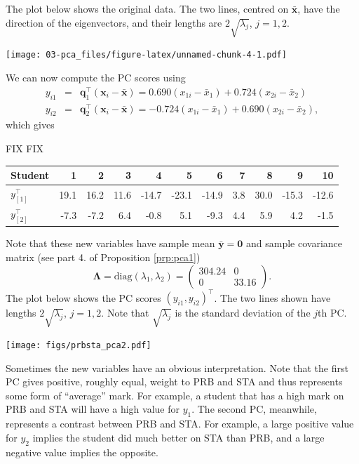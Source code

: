\documentclass[]{book}
\theoremstyle{definition}
\theoremstyle{definition}
\theoremstyle{definition}
\theoremstyle{remark}
\begin{document}
The plot below shows the original data. The two lines, centred on \(\bar{\boldsymbol x}\), have the direction of the eigenvectors, and their lengths are \(2 \sqrt{\lambda_j}\), \(j=1,2\).

\texttt{[image: 03-pca\_files/figure-latex/unnamed-chunk-4-1.pdf]}

We can now compute the PC scores using
\begin{eqnarray*}
y_{i1} &=& \boldsymbol q_1^\top (\boldsymbol x_i - \bar{\boldsymbol x}) = 0.690 (x_{1i} - \bar{x}_1) + 0.724 (x_{2i} - \bar{x}_2) \\
y_{i2} &=& \boldsymbol q_2^\top (\boldsymbol x_i - \bar{\boldsymbol x}) = -0.724 (x_{1i} - \bar{x}_1) + 0.690 (x_{2i} - \bar{x}_2),
\end{eqnarray*}
which gives

FIX FIX

\begin{tabular}{l|rrrrrrrrrr}
Student & 1 & 2 & 3 & 4 & 5 & 6 & 7 & 8 & 9 & 10 \\ \hline
$y_{[1]}^\top$ & 19.1 & 16.2 & 11.6 & -14.7 & -23.1 & -14.9 & 3.8 & 30.0 & -15.3 & -12.6 \\
$y_{[2]}^\top$ & -7.3 & -7.2 & 6.4 & -0.8 & 5.1 & -9.3 & 4.4 & 5.9 & 4.2 & -1.5
\end{tabular}

Note that these new variables have sample mean \(\bar{\boldsymbol y}=\boldsymbol 0\) and sample covariance matrix (see part 4. of Proposition \ref{prp:pca1})
\[
\boldsymbol \Lambda= \text{diag}(\lambda_1,\lambda_2) =  \begin{pmatrix} 304.24 & 0 \\ 0 & 33.16 \end{pmatrix}.
\]
The plot below shows the PC scores \((y_{i1},y_{i2})^\top\). The two lines shown have lengths \(2\sqrt{\lambda_j}\), \(j=1,2\). Note that \(\sqrt{\lambda_j}\) is the standard deviation of the \(j\)th PC.

\begin{center}
\texttt{[image: figs/prbsta\_pca2.pdf]}
\end{center}

Sometimes the new variables have an obvious interpretation. Note that the first PC gives positive, roughly equal, weight to PRB and STA and thus represents some form of ``average'' mark. For example, a student that has a high mark on PRB and STA will have a high value for \(y_1\). The second PC, meanwhile, represents a contrast between PRB and STA. For example, a large positive value for \(y_2\) implies the student did much better on STA than PRB, and a large negative value implies the opposite.
\end{document}
